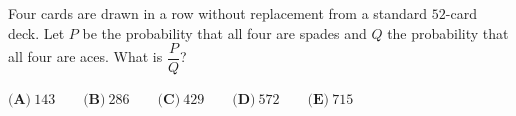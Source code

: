 Four cards are drawn in a row without replacement from a standard $52$-card deck. Let $P$ be the probability that all four are spades and $Q$ the probability that all four are aces. What is $\dfrac PQ$?

$\textbf{(A)}\ 143\qquad\textbf{(B)}\ 286\qquad\textbf{(C)}\ 429\qquad\textbf{(D)}\ 572\qquad\textbf{(E)}\ 715$
